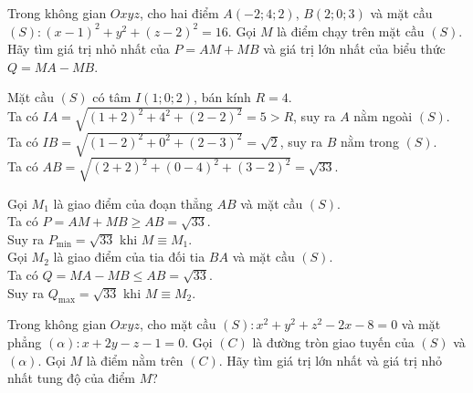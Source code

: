 \begin{ex}%
Trong không gian $Oxyz$, cho hai điểm $A(-2;4;2)$, $B(2;0;3)$ và mặt cầu $(S)\colon (x-1)^2+y^2+(z-2)^2=16$. Gọi $M$ là điểm chạy trên mặt cầu $(S)$. Hãy tìm giá trị nhỏ nhất của $P=AM+MB$ và giá trị lớn nhất của biểu thức $Q=MA-MB$.
\loigiai
{
\immini
{
Mặt cầu $(S)$ có tâm $I(1;0;2)$, bán kính $R=4$. \\
Ta có $IA=\sqrt{\left(1+2\right)^2+4^2+\left(2-2\right)^2}=5>R$, suy ra $A$ nằm ngoài $(S)$. \\
Ta có $IB=\sqrt{\left(1-2\right)^2+0^2+\left(2-3\right)^2}=\sqrt{2}$, suy ra $B$ nằm trong $(S)$. \\
Ta có $AB=\sqrt{\left(2+2\right)^2+\left(0-4\right)^2+\left(3-2\right)^2}=\sqrt{33}$.
}
{
}
\noindent
Gọi $M_1$ là giao điểm của đoạn thẳng $AB$ và mặt cầu $(S)$. \\
Ta có $P=AM+MB\geqslant AB=\sqrt{33}$. \\
Suy ra $P_{\min}=\sqrt{33}$ khi $M\equiv M_1$. \\
Gọi $M_2$ là giao điểm của tia đối tia $BA$ và mặt cầu $(S)$. \\
Ta có $Q=MA-MB\leqslant AB=\sqrt{33}$. \\
Suy ra $Q_{\max}=\sqrt{33}$ khi $M\equiv M_2$.
}
\end{ex}

\begin{ex}%
	Trong không gian $Oxyz$, cho mặt cầu $(S)\colon x^2+y^2+z^2-2 x-8=0$ và mặt phẳng $(\alpha)\colon x+2y-z-1=0$. Gọi $(C)$ là đường tròn giao tuyến của $(S)$ và $(\alpha)$. Gọi $M$ là điểm nằm trên $(C)$. Hãy tìm giá trị lớn nhất và giá trị nhỏ nhất tung độ của điểm $M$?
\end{ex}

